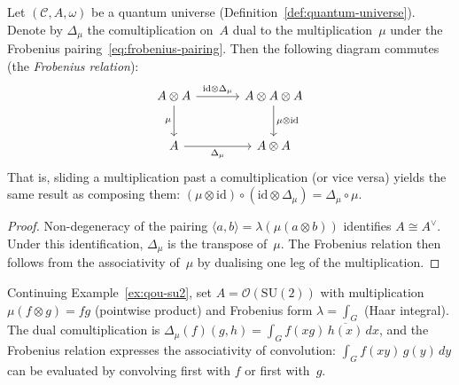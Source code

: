 
\begin{proposition}
\label{prop:frobenius-relation}
Let $(\mathcal{C}, A, \omega)$ be a quantum universe
(Definition~\ref{def:quantum-universe}).  Denote by $\Delta_\mu$ the
comultiplication on~$A$ dual to the multiplication~$\mu$ under the
Frobenius pairing~\eqref{eq:frobenius-pairing}.  Then the following
diagram commutes (the \emph{Frobenius relation}):
\begin{equation}\label{eq:frobenius-relation}
\begin{tikzcd}[row sep=2.5em, column sep=3.5em]
  A \otimes A
    \ar[r, "\mathrm{id} \otimes \Delta_\mu"]
    \ar[d, "\mu"']
  & A \otimes A \otimes A
    \ar[d, "\mu \otimes \mathrm{id}"]
  \\
  A \ar[r, "\Delta_\mu"']
  & A \otimes A
\end{tikzcd}
\end{equation}
That is, sliding a multiplication past a comultiplication (or vice versa)
yields the same result as composing them:
$(\mu \otimes \mathrm{id}) \circ (\mathrm{id} \otimes \Delta_\mu)
= \Delta_\mu \circ \mu$.
\end{proposition}

\begin{proof}
Non-degeneracy of the pairing
$\langle a, b \rangle = \lambda(\mu(a \otimes b))$ identifies
$A \cong A^{\vee}$.  Under this identification, $\Delta_\mu$ is the
transpose of~$\mu$.  The Frobenius relation then follows from the
associativity of~$\mu$ by dualising one leg of the multiplication.
\end{proof}

\begin{example}
\label{ex:frobenius-su2}
Continuing Example~\ref{ex:qou-su2}, set
$A = \mathcal{O}(\mathrm{SU}(2))$ with multiplication
$\mu(f \otimes g) = fg$ (pointwise product) and Frobenius form
$\lambda = \int_G$ (Haar integral).  The dual comultiplication is
$\Delta_\mu(f)(g,h) = \int_G f(xg)\,\overline{h(x)}\,dx$, and the
Frobenius relation expresses the associativity of convolution:
$\int_G f(xy)\,g(y)\,dy$ can be evaluated by convolving first with $f$
or first with~$g$.
\end{example}

